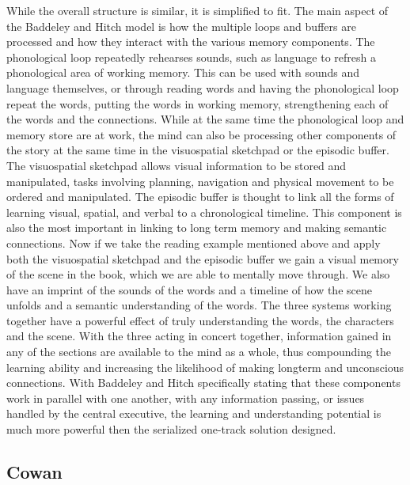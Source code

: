 While the overall structure is similar, it is simplified to fit.  The main aspect of the Baddeley and Hitch model is how the multiple loops and buffers are processed and how they interact with the various memory components.  The phonological loop repeatedly rehearses sounds, such as language to refresh a phonological area of working memory.  This can be used with sounds and language themselves, or through reading words and having the phonological loop repeat the words, putting the words in working memory, strengthening each of the words and the connections.  While at the same time the phonological loop and memory store are at work, the mind can also be processing other components of the story at the same time in the visuospatial sketchpad or the episodic buffer. The visuospatial sketchpad allows visual information to be stored and manipulated, tasks involving planning, navigation and physical movement to be ordered and manipulated.  The episodic buffer is thought to link all the forms of learning visual, spatial, and verbal to a chronological timeline.  This component is also the most important in linking to long term memory and making semantic connections.  Now if we take the reading example mentioned above and apply both the visuospatial sketchpad and the episodic buffer we gain a visual memory of the scene in the book, which we are able to mentally move through.  We also have an imprint of the sounds of the words and a timeline of how the scene unfolds and a semantic understanding of the words.  The three systems working together have a powerful effect of truly understanding the words, the characters and the scene. With the three acting in concert together, information gained in any of the sections are available to the mind as a whole, thus compounding the learning ability and increasing the likelihood of making longterm and unconscious connections.  With Baddeley and Hitch specifically stating that these components work in parallel with one another, with any information passing, or issues handled by the central executive, the learning and understanding potential is much more powerful then the serialized one-track solution designed.

\subsection{Cowan}

